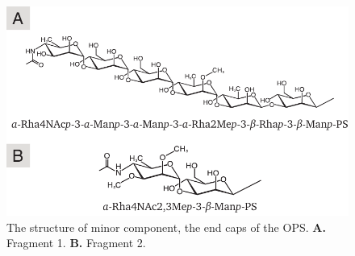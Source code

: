 		 \begin{figure}[H]
		 	\begin{center}
		 		\includegraphics[]{lps_chapter/img/lpsends.pdf}
		 	\end{center}
		 	\caption{The structure of minor component, the end caps of the \ac{OPS}. \textbf{A.} Fragment 1. \textbf{B.} Fragment 2.}
		 	\label{fig:lpsends}
		 \end{figure}

